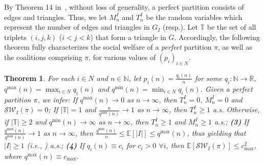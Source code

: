 \documentclass[letterpaper]{article} %
\newtheorem{theorem}{Theorem}
\begin{document}
By Theorem 14 in~\cite{peters2016complexity}, without loss of generality, a perfect partition consists of edges and triangles. Thus, we let $M_n^I$ and $T_n^I$ be the random variables which represent the number of edges and triangles in $G_I$ (resp.). Let $\mathbb{T}$ be the set of all triplets $(i,j,k)$ ($i<j<k$) that form a triangle in $G$. Accordingly, the following theorem fully characterizes the social welfare of a \textit{perfect} partition $\pi$, as well as the coalitions comprising $\pi$, for various values of $(p_i)_{i \in N}$. 
\begin{theorem}
\label{theorem:perfect}
For each $i \in N$ and $n \in \mathbb{N}$, let $p_i(n) = \frac{q_i(n)}{n}$ for some $q_i : \mathbb{N} \rightarrow \mathbb{R}$, $q^{\max}(n) = \max_{i \in N} q_i(n)$ and $q^{\min}(n) = \min_{i \in N} q_i(n)$. Given a perfect partition $\pi$, we infer: {} If $q^{\max}(n) \rightarrow 0$ as $n \rightarrow \infty$, then $T_n^I = 0$, $M_n^I = 0$ and $\mathcal{SW}_I(\pi) = 0$; {} If $|\mathbb{T}| = 1$ and $\frac{n}{q^{\min}(n)} \rightarrow 1$ as $n \rightarrow \infty$, then $T_n^I \geq 1$ a.s. Otherwise, if $|\mathbb{T}| \geq 2$ and $q^{\min}(n) \rightarrow \infty$ as $n \rightarrow \infty$, then $T_n^I \geq 1$ and $M_n^I \geq 1$ a.s.; {\normalfont \textbf{(3)}} If $\frac{q^{\max}(n)}{q^{\min}(n)} \rightarrow 1$ as $n \rightarrow \infty$, then $\frac{q^{\min}(n)}{n} \leq \mathbb{E}[|I|] \leq q^{\max}(n)$, thus yielding that $|I| \geq 1$ (i.e., {}) a.s.; {\normalfont \textbf{(4)}} If $q_i(n) \equiv c_i$ for $c_i > 0$ $\forall i$, then $\mathbb{E}[\mathcal{SW}_I(\pi)] \leq c_{\max}^2$, where $q^{\max}(n) \equiv c_{\max}$.

\end{theorem}
\end{document}
